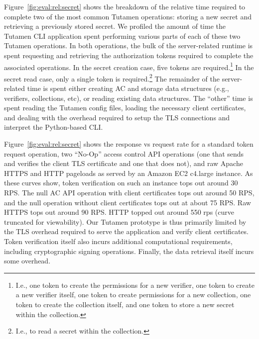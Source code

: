 Figure~\ref{fig:eval:rel:secret} shows the breakdown of the relative
time required to complete two of the most common Tutamen operations:
storing a new secret and retrieving a previously stored secret. We
profiled the amount of time the Tutamen CLI application spent
performing various parts of each of these two Tutamen operations. In
both operations, the bulk of the server-related runtime is spent
requesting and retrieving the authorization tokens required to
complete the associated operations. In the secret creation case, five
tokens are required.\footnote{I.e., one token to create the
  permissions for a new verifier, one token to create a new verifier
  itself, one token to create permissions for a new collection, one
  token to create the collection itself, and one token to store a new
  secret within the collection.} In the secret read case, only a
single token is required.\footnote{I.e., to read a secret within the
  collection.}  The remainder of the server-related time is spent
either creating AC and storage data structures (e.g., verifiers,
collections, etc), or reading existing data structures. The ``other''
time is spent reading the Tutamen config files, loading the necessary
client certificates, and dealing with the overhead required to setup
the TLS connections and interpret the Python-based CLI.
 
Figure~\ref{fig:eval:rel:secret} shows the response vs request rate
for a standard token request operation, two ``No-Op'' access control
API operations (one that sends and verifies the client TLS certificate
and one that does not), and raw Apache HTTPS and HTTP pageloads as
served by an Amazon EC2 c4.large instance. As these curves show, token
verification on such an instance tops out around 30 RPS. The null AC
API operation with client certificates tops out around 50 RPS, and the
null operation without client certificates tops out at about 75
RPS. Raw HTTPS tops out around 90 RPS. HTTP topped out around 550 rps
(curve truncated for viewability). Our Tutamen prototype is thus
primarily limited by the TLS overhead required to serve the
application and verify client certificates. Token verification itself
also incurs additional computational requirements, including
cryptographic signing operations. Finally, the data retrieval itself
incurs some overhead.

